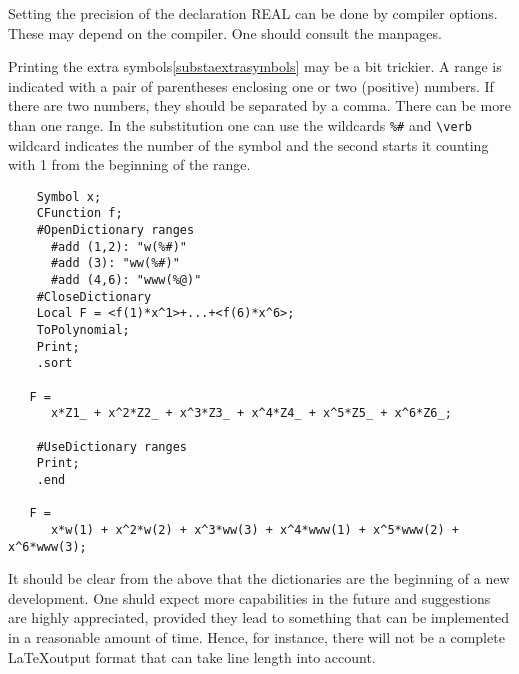 Setting the precision of the declaration REAL can be done by 
compiler options. These may depend on the compiler. One should consult the 
manpages.

Printing the extra symbols\ref{substaextrasymbols} 
may be a bit trickier. A range is indicated with 
a pair of parentheses enclosing one or two (positive) numbers. If there are 
two numbers, they should be separated by a comma. There can be more than 
one range. In the substitution one can use the wildcards \verb:%#: and 
\verb:\verb:%
wildcard indicates the number of the symbol and the second starts it 
counting with 1 from the beginning of the range.
\begin{verbatim}
    Symbol x;
    CFunction f;
    #OpenDictionary ranges
      #add (1,2): "w(%#)"
      #add (3): "ww(%#)"
      #add (4,6): "www(%@)"
    #CloseDictionary
    Local F = <f(1)*x^1>+...+<f(6)*x^6>;
    ToPolynomial;
    Print;
    .sort

   F =
      x*Z1_ + x^2*Z2_ + x^3*Z3_ + x^4*Z4_ + x^5*Z5_ + x^6*Z6_;

    #UseDictionary ranges
    Print;
    .end

   F =
      x*w(1) + x^2*w(2) + x^3*ww(3) + x^4*www(1) + x^5*www(2) + x^6*www(3);
\end{verbatim}

It should be clear from the above that the dictionaries are the beginning 
of a new development. One shuld expect more capabilities in the future and 
suggestions are highly appreciated, provided they lead to something that 
can be implemented in a reasonable amount of time. Hence, for instance, 
there will not be a complete \LaTeX output format that can take line length 
into account.
